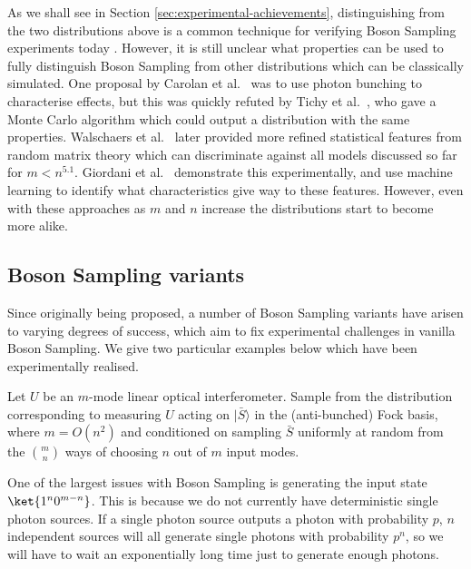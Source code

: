 As we shall see in Section \ref{sec:experimental-achievements}, distinguishing from the two distributions above is a common technique for verifying Boson Sampling experiments today \cite{carolan2015, zhong2018, paesani2018, wang2019}. However, it is still unclear what properties can be used to fully distinguish Boson Sampling from other distributions which can be classically simulated. One proposal by Carolan et al.~\cite{carolan2014} was to use photon bunching to characterise effects, but this was quickly refuted by Tichy et al.~\cite{tichy2014}, who gave a Monte Carlo algorithm which could output a distribution with the same properties. Walschaers et al.~\cite{walschaers2016, walschaers2016thesis} later provided more refined statistical features from random matrix theory which can discriminate against all models discussed so far for $m<n^{5.1}$. Giordani et al.~\cite{giordani2018} demonstrate this experimentally, and use machine learning to identify what characteristics give way to these features. However, even with these approaches as $m$ and $n$ increase the distributions start to become more alike.

\subsection{Boson Sampling variants}
\label{ssec:bs-variants}

Since originally being proposed, a number of Boson Sampling variants have arisen to varying degrees of success, which aim to fix experimental challenges in vanilla Boson Sampling. We give two particular examples below which have been experimentally realised.

\begin{problem} Let $U$ be an $m$-mode linear optical interferometer. Sample from the distribution corresponding to measuring $U$ acting on $|\bar{S}\rangle$ in the (anti-bunched) Fock basis, where $m=O(n^2)$ and conditioned on sampling $\bar{S}$ uniformly at random from the $\binom{m}{n}$ ways of choosing $n$ out of $m$ input modes.
\end{problem}

One of the largest issues with Boson Sampling is generating the input state $\ket{1^n0^{m-n}}$. This is because we do not currently have deterministic single photon sources. If a single photon source outputs a photon with probability $p$, $n$ independent sources will all generate single photons with probability $p^n$, so we will have to wait an exponentially long time just to generate enough photons.

